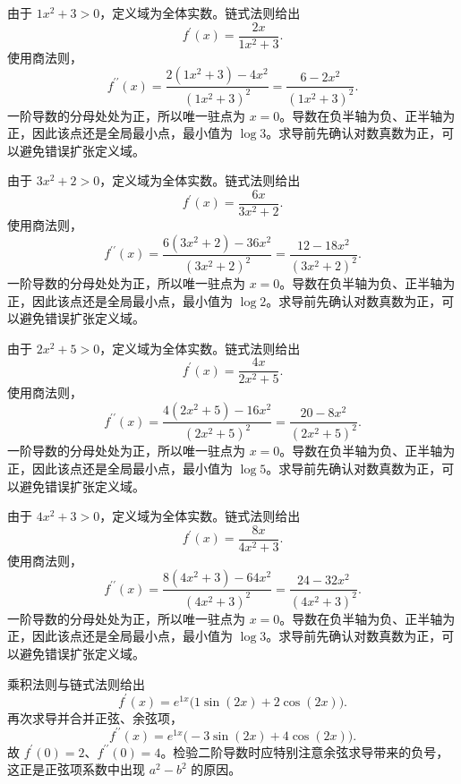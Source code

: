 \documentclass[UTF8,12pt,a4paper,fontset=fandol]{ctexart}
\begin{document}
\begin{solve}\label{ans:c8q15}
由于 $1x^2+3>0$，定义域为全体实数。链式法则给出
\[
f^{\prime}(x)=\frac{2x}{1x^2+3}.
\]
使用商法则，
\[
f^{\prime\prime}(x)=\frac{2(1x^2+3)-4x^2}{(1x^2+3)^2}=\frac{6-2x^2}{(1x^2+3)^2}.
\]
一阶导数的分母处处为正，所以唯一驻点为 $x=0$。导数在负半轴为负、正半轴为正，因此该点还是全局最小点，最小值为 $\log 3$。求导前先确认对数真数为正，可以避免错误扩张定义域。
\end{solve}

\begin{solve}\label{ans:c8q16}
由于 $3x^2+2>0$，定义域为全体实数。链式法则给出
\[
f^{\prime}(x)=\frac{6x}{3x^2+2}.
\]
使用商法则，
\[
f^{\prime\prime}(x)=\frac{6(3x^2+2)-36x^2}{(3x^2+2)^2}=\frac{12-18x^2}{(3x^2+2)^2}.
\]
一阶导数的分母处处为正，所以唯一驻点为 $x=0$。导数在负半轴为负、正半轴为正，因此该点还是全局最小点，最小值为 $\log 2$。求导前先确认对数真数为正，可以避免错误扩张定义域。
\end{solve}

\begin{solve}\label{ans:c8q17}
由于 $2x^2+5>0$，定义域为全体实数。链式法则给出
\[
f^{\prime}(x)=\frac{4x}{2x^2+5}.
\]
使用商法则，
\[
f^{\prime\prime}(x)=\frac{4(2x^2+5)-16x^2}{(2x^2+5)^2}=\frac{20-8x^2}{(2x^2+5)^2}.
\]
一阶导数的分母处处为正，所以唯一驻点为 $x=0$。导数在负半轴为负、正半轴为正，因此该点还是全局最小点，最小值为 $\log 5$。求导前先确认对数真数为正，可以避免错误扩张定义域。
\end{solve}

\begin{solve}\label{ans:c8q18}
由于 $4x^2+3>0$，定义域为全体实数。链式法则给出
\[
f^{\prime}(x)=\frac{8x}{4x^2+3}.
\]
使用商法则，
\[
f^{\prime\prime}(x)=\frac{8(4x^2+3)-64x^2}{(4x^2+3)^2}=\frac{24-32x^2}{(4x^2+3)^2}.
\]
一阶导数的分母处处为正，所以唯一驻点为 $x=0$。导数在负半轴为负、正半轴为正，因此该点还是全局最小点，最小值为 $\log 3$。求导前先确认对数真数为正，可以避免错误扩张定义域。
\end{solve}

\begin{solve}\label{ans:c8q19}
乘积法则与链式法则给出
\[
f^{\prime}(x)=e^{1x}\bigl(1\sin(2x)+2\cos(2x)\bigr).
\]
再次求导并合并正弦、余弦项，
\[
f^{\prime\prime}(x)=e^{1x}\bigl(-3\sin(2x)+4\cos(2x)\bigr).
\]
故 $f^{\prime}(0)=2$、$f^{\prime\prime}(0)=4$。检验二阶导数时应特别注意余弦求导带来的负号，这正是正弦项系数中出现 $a^2-b^2$ 的原因。
\end{solve}
\end{document}
